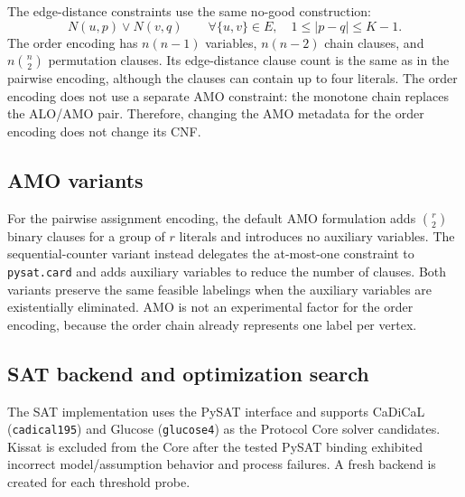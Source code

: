 The edge-distance constraints use the same no-good construction:
\begin{equation}
  N(u,p)\vee N(v,q)
  \qquad
  \forall\{u,v\}\in E,\quad
  1\leq |p-q|\leq K-1.
  \label{eq:order-distance}
\end{equation}
The order encoding has $n(n-1)$ variables, $n(n-2)$ chain clauses, and
$n\binom{n}{2}$ permutation clauses. Its edge-distance clause count is the
same as in the pairwise encoding, although the clauses can contain up to four
literals. The order encoding does not use a separate AMO constraint: the
monotone chain replaces the ALO/AMO pair. Therefore, changing the AMO metadata
for the order encoding does not change its CNF.

\subsection{AMO variants}
For the pairwise assignment encoding, the default AMO formulation adds
$\binom{r}{2}$ binary clauses for a group of $r$ literals and introduces no
auxiliary variables. The sequential-counter variant instead delegates the
at-most-one constraint to \texttt{pysat.card} and adds auxiliary variables to
reduce the number of clauses. Both variants preserve the same feasible
labelings when the auxiliary variables are existentially eliminated. AMO is
not an experimental factor for the order encoding, because the order chain
already represents one label per vertex.

\subsection{SAT backend and optimization search}
The SAT implementation uses the PySAT interface and supports CaDiCaL
(\texttt{cadical195}) and Glucose (\texttt{glucose4}) as the Protocol Core
solver candidates. Kissat is excluded from the Core after the tested PySAT
binding exhibited incorrect model/assumption behavior and process failures.
A fresh backend is created for each threshold probe.

